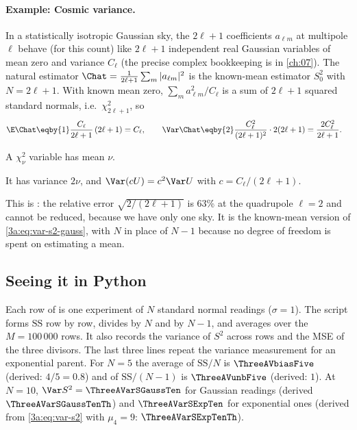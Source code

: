 \paragraph{Example: Cosmic variance.}
\label{3a:ex:cosmic-variance}
In a statistically isotropic Gaussian sky, the $2\ell+1$ coefficients
$a_{\ell m}$ at multipole $\ell$ behave (for this count) like $2\ell+1$
independent real Gaussian variables of mean zero and variance $C_\ell$
(the precise complex bookkeeping is in \cref{ch:07}). The natural estimator
$\Chat=\frac{1}{2\ell+1}\sum_m|a_{\ell m}|^2$ is the known-mean estimator
$S_0^2$ with $N=2\ell+1$. With known mean zero, $\sum_ma_{\ell m}^2/C_\ell$
is a sum of $2\ell+1$ squared standard normals, i.e.\ $\chi^2_{2\ell+1}$, so
\begin{align*}
  \E\Chat &\eqby{1} \frac{C_\ell}{2\ell+1}\,(2\ell+1)=C_\ell,\qquad
  \Var\Chat \eqby{2} \frac{C_\ell^2}{(2\ell+1)^2}\cdot2(2\ell+1)=\frac{2C_\ell^2}{2\ell+1}.
\end{align*}
\begin{explain}
  \item A $\chi^2_\nu$ variable has mean $\nu$.
  \item It has variance $2\nu$, and $\Var(cU)=c^2\Var U$ with $c=C_\ell/(2\ell+1)$.
\end{explain}
This is : the relative error
$\sqrt{2/(2\ell+1)}$ is 63\% at the quadrupole $\ell=2$ and cannot be reduced,
because we have only one sky. It is the known-mean version of
\eqref{3a:eq:var-s2-gauss}, with $N$ in place of $N-1$ because no degree of
freedom is spent on estimating a mean.

\subsection{Seeing it in Python}
\label{3a:sec:var-python}


Each row of  is one experiment of $N$ standard normal readings
($\sigma=1$). The script forms $\mathrm{SS}$ row by row, divides by $N$ and
by $N-1$, and averages over the $M=100\,000$ rows. It also records the
variance of $S^2$ across rows and the MSE of the three divisors. The last
three lines repeat the variance measurement for an exponential parent. For
$N=5$ the average of $\mathrm{SS}/N$ is $\ThreeAVbiasFive$ (derived:
$4/5=0.8$) and of $\mathrm{SS}/(N-1)$ is $\ThreeAVunbFive$ (derived: $1$).
At $N=10$, $\Var S^2=\ThreeAVarSGaussTen$ for Gaussian readings (derived
$\ThreeAVarSGaussTenTh$) and $\ThreeAVarSExpTen$ for exponential ones
(derived from \eqref{3a:eq:var-s2} with $\mu_4=9$: $\ThreeAVarSExpTenTh$).

